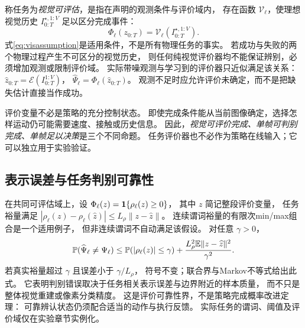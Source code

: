 称任务为\emph{视觉可评估}，是指在声明的观测条件与评价域内，
存在函数 $\mathcal V_\ell$，使理想视觉历史 $I^{\star,1:V}_{0:T}$ 足以区分完成事件：
\begin{equation}
 \Phi_\ell(z_{0:T})=\mathcal V_\ell(I_{0:T}^{\star,1:V}).
 \label{eq:visassumption}
\end{equation}
式\eqref{eq:visassumption}是适用条件，不是所有物理任务的事实。
若成功与失败的两个物理过程产生不可区分的视觉历史，
则任何纯视觉评价器均不能保证辨别，必须增加观测或限制评价域。
实际带噪观测与学习到的评价器只近似满足该关系：
$\widehat z_{0:T}=\mathcal E(I_{0:T}^{1:V})$，
$\widehat\Psi_\ell=\Phi_\ell(\widehat z_{0:T})$。
观测不足时应允许评价未确定，而不是把缺失估计直接当作成功。

评价变量不必是策略的充分控制状态。
即使完成条件能从当前图像确定，选择怎样运动仍可能需要速度、接触或历史信息。
因此，\emph{视觉可评价完成、单帧可判别完成、单帧足以决策}是三个不同命题。
任务评价器也不必作为策略在线输入；它可以独立用于实验验证。

\subsection{表示误差与任务判别可靠性}
在共同可评估域上，设
$\Phi_\ell(z)=\mathbf 1\{\rho_\ell(z)\ge0\}$，
其中 $z$ 简记整段评价变量，
任务裕量满足
$|\rho_\ell(z)-\rho_\ell(\widehat z)|\le L_\rho\|z-\widehat z\|$。
连续谓词裕量的有限次min/max组合是一个适用例子，
但非连续谓词不自动满足该假设。
对任意 $\gamma>0$，
\begin{equation}
 \mathbb P(\widehat\Psi_\ell\ne\Psi_\ell)
 \le\mathbb P(|\rho_\ell(z)|\le\gamma)
 +\frac{L_\rho^2\mathbb E\|z-\widehat z\|^2}{\gamma^2}.
 \label{eq:visualmargin}
\end{equation}
若真实裕量超过 $\gamma$ 且误差小于 $\gamma/L_\rho$，
符号不变；联合界与Markov不等式给出此式。
它表明判别错误取决于任务相关表示误差与边界附近的样本质量，
而不只是整体视觉重建或像素分类精度。
这是评价可靠性界，不是策略完成概率改进定理：
可靠辨认状态仍须配合适当的动作与执行反馈。
实际任务的谓词、阈值及评价域仅在实验章节实例化。
